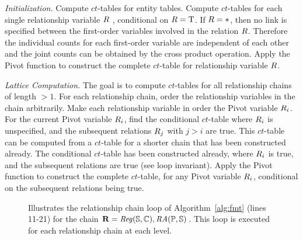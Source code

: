 \documentclass{acm_proc_article-sp}
\newcommand{\ct}{\mathit{ct}}
\begin{document}
{\em Initialization.} Compute $\ct$-tables for entity tables.
Compute $\ct$-tables for each single relationship variable $R$ , conditional on $R = \mathrm{T}$. %
If $R = \ast$, then no link is specified between the first-order variables involved in the relation $R$. Therefore the individual counts for each first-order variable are independent of each other and the joint counts can be obtained by the cross product operation. %
Apply the Pivot function to construct the  complete $\ct$-table for relationship variable $R$. %

{\em Lattice Computation.} The goal is to compute $\ct$-tables for all relationship chains of length $>1$. For each relationship chain, order the relationship variables in the chain arbitrarily. Make each relationship variable in order the Pivot variable $R_{i}$. For the current Pivot variable $R_{i}$, find the conditional $\ct$-table where $R_{i}$ is unspecified, and the subsequent relations $R_{j}$ with $j>i$ are true. This $\ct$-table can be computed from a $ct$-table for a shorter chain that has been constructed already. The conditional $ct$-table   has been constructed already, where $R_{i}$ is true, and the subsequent relations are true (see loop invariant). Apply the Pivot function to construct the  complete $\ct$-table, for any Pivot variable $R_{i}$,  conditional on the subsequent relations being true. 
\begin{figure}[htbp]
\begin{center}
\caption{Illustrates the relationship chain loop of Algorithm~\ref{alg:fmt} (lines 11-21) for the chain $\mathbf{R}= \it{Reg}(\mathbb{S},\mathbb{C}),\mathit{RA}(\mathbb{P},\mathbb{S})$. This loop is executed for each relationship chain at each level.
\label{fig:rchain-loop}}
\end{center}
\end{figure}
\end{document}
